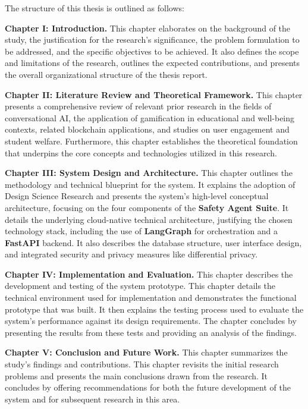 The structure of this thesis is outlined as follows:

\textbf{Chapter I: Introduction.} This chapter elaborates on the background of the study, the justification for the research's significance, the problem formulation to be addressed, and the specific objectives to be achieved. It also defines the scope and limitations of the research, outlines the expected contributions, and presents the overall organizational structure of the thesis report.

\textbf{Chapter II: Literature Review and Theoretical Framework.} This chapter presents a comprehensive review of relevant prior research in the fields of conversational AI, the application of gamification in educational and well-being contexts, related blockchain applications, and studies on user engagement and student welfare. Furthermore, this chapter establishes the theoretical foundation that underpins the core concepts and technologies utilized in this research.

\textbf{Chapter III: System Design and Architecture.} This chapter outlines the methodology and technical blueprint for the system. It explains the adoption of Design Science Research and presents the system's high-level conceptual architecture, focusing on the four components of the \textbf{Safety Agent Suite}. It details the underlying cloud-native technical architecture, justifying the chosen technology stack, including the use of \textbf{LangGraph} for orchestration and a \textbf{FastAPI} backend. It also describes the database structure, user interface design, and integrated security and privacy measures like differential privacy.

\textbf{Chapter IV: Implementation and Evaluation.} This chapter describes the development and testing of the system prototype. This chapter details the technical environment used for implementation and demonstrates the functional prototype that was built. It then explains the testing process used to evaluate the system's performance against its design requirements. The chapter concludes by presenting the results from these tests and providing an analysis of the findings.

\textbf{Chapter V: Conclusion and Future Work.} This chapter summarizes the study's findings and contributions. This chapter revisits the initial research problems and presents the main conclusions drawn from the research. It concludes by offering recommendations for both the future development of the system and for subsequent research in this area.


